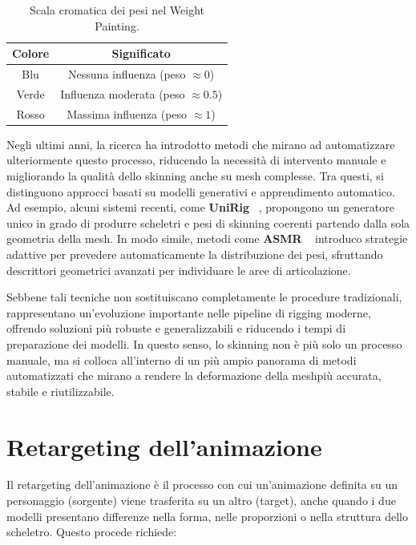 \begin{itemize}
\begin{table}[h]
\centering
    \begin{tabular}{|c|c|}
    \hline
    \textbf{Colore} & \textbf{Significato} \\ \hline
    Blu   & Nessuna influenza (peso $\approx 0$) \\ \hline
    Verde & Influenza moderata (peso $\approx 0.5$) \\ \hline
    Rosso & Massima influenza (peso $\approx 1$) \\ \hline
    \end{tabular}
    \caption{Scala cromatica dei pesi nel Weight Painting.}
\end{table}

Negli ultimi anni, la ricerca ha introdotto metodi che mirano ad automatizzare ulteriormente questo processo, riducendo la necessità di intervento manuale e migliorando la qualità dello skinning anche su mesh complesse. Tra questi, si distinguono approcci basati su modelli generativi e apprendimento automatico. Ad esempio, alcuni sistemi recenti, come \textbf{UniRig} ~\cite{uni}, propongono un generatore unico in grado di produrre scheletri e pesi di skinning coerenti partendo dalla sola geometria della mesh. In modo simile, metodi come \textbf{ASMR} ~\cite{asmr} introduco strategie adattive per prevedere automaticamente la distribuzione dei pesi, sfruttando descrittori geometrici avanzati per individuare le aree di articolazione.

Sebbene tali tecniche non sostituiscano completamente le procedure tradizionali, rappresentano un'evoluzione importante nelle pipeline di rigging moderne, offrendo soluzioni più robuste e generalizzabili e riducendo i tempi di preparazione dei modelli. In questo senso, lo skinning non è più solo un processo manuale, ma si colloca all'interno di un più ampio panorama di metodi automatizzati che mirano a rendere la deformazione della meshpiù accurata, stabile e riutilizzabile.


\section{Retargeting dell'animazione}

Il retargeting dell'animazione è il processo con cui un'animazione definita su un personaggio (sorgente) viene trasferita su un altro (target), anche quando i due modelli presentano differenze nella forma, nelle proporzioni o nella struttura dello scheletro.
Questo procede richiede: 


\end{itemize}
